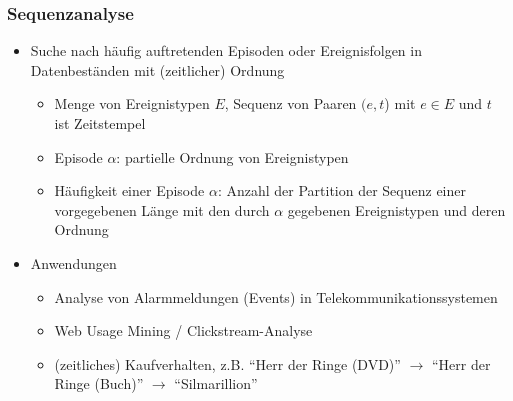 \begin{frame}
\frametitle{Sequenzanalyse}

\begin{itemize}
\item Suche nach häufig auftretenden Episoden oder Ereignisfolgen in
  Datenbeständen mit (zeitlicher) Ordnung
\begin{itemize}
\item Menge von Ereignistypen $E$, Sequenz von Paaren $(e, t$) mit $e
  \in E$ und $t$ ist Zeitstempel
\item Episode $\alpha$: partielle Ordnung von Ereignistypen
\item Häufigkeit einer Episode $\alpha$: Anzahl der Partition der
  Sequenz einer vorgegebenen Länge mit den durch $\alpha$ gegebenen
  Ereignistypen und deren Ordnung
\end{itemize}

\item Anwendungen
\begin{itemize}
\item Analyse von Alarmmeldungen (Events) in
  Telekommunikationssystemen
\item Web Usage Mining / Clickstream-Analyse
\item (zeitliches) Kaufverhalten, z.B.
 "`Herr der Ringe (DVD)"'
  $\longrightarrow$ "`Herr der Ringe (Buch)"' $\longrightarrow$
  "`Silmarillion"'
\end{itemize}
\end{itemize}

\end{frame}



